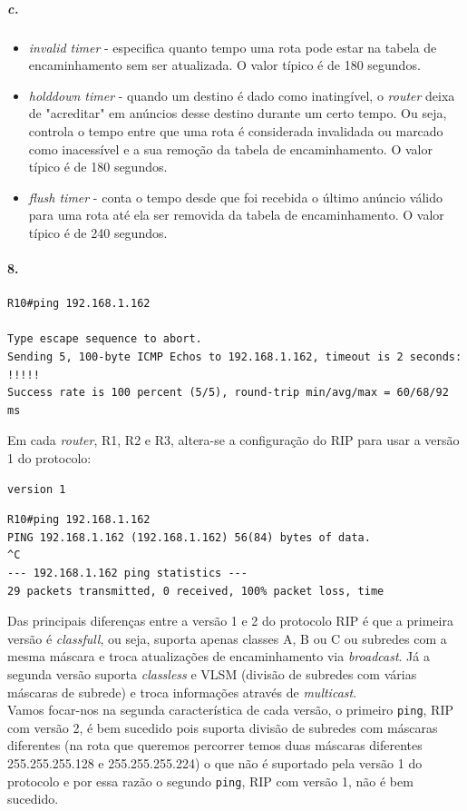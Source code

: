 \subparagraph{c.}
\begin{itemize}
\item \emph{invalid timer} - especifica quanto tempo uma rota pode estar na tabela de encaminhamento sem ser atualizada. O valor típico é de 180 segundos.
\item \emph{holddown timer} - quando um destino é dado como inatingível, o \emph{router} deixa de "acreditar" em anúncios desse destino durante um certo tempo. Ou seja,  controla o tempo entre que uma rota é considerada invalidada ou marcado como inacessível e a sua remoção da tabela de encaminhamento. O valor típico é de 180 segundos.
\item \emph{flush timer} - conta o tempo desde que foi recebida o último anúncio válido
para uma rota até ela ser removida da tabela de encaminhamento. O valor típico é de 240 segundos.
\end{itemize}

\paragraph{8.}
\begin{verbatim}
R10#ping 192.168.1.162

Type escape sequence to abort.
Sending 5, 100-byte ICMP Echos to 192.168.1.162, timeout is 2 seconds:
!!!!!
Success rate is 100 percent (5/5), round-trip min/avg/max = 60/68/92 ms
\end{verbatim}

Em cada \emph{router}, \textsf{R1}, \textsf{R2} e \textsf{R3}, altera-se a configuração do RIP para usar a versão 1 do protocolo:
\begin{verbatim}
version 1
\end{verbatim}

\begin{verbatim}
R10#ping 192.168.1.162
PING 192.168.1.162 (192.168.1.162) 56(84) bytes of data.
^C
--- 192.168.1.162 ping statistics ---
29 packets transmitted, 0 received, 100% packet loss, time 
\end{verbatim}

Das principais diferenças entre a versão 1 e 2 do protocolo RIP é que a primeira versão é \emph{classfull}, ou seja, suporta apenas classes A, B ou C ou subredes com a mesma máscara e troca atualizações de encaminhamento via \emph{broadcast}. Já a segunda versão suporta \emph{classless} e VLSM (divisão de subredes com várias máscaras de subrede) e troca informações através de \emph{multicast}.\\
Vamos focar-nos na segunda característica de cada versão, o primeiro \texttt{ping}, RIP com versão 2, é bem sucedido pois suporta divisão de subredes com máscaras diferentes (na rota que queremos percorrer temos duas máscaras diferentes 255.255.255.128 e 255.255.255.224) o que não é suportado pela versão 1 do protocolo e por essa razão o segundo \texttt{ping}, RIP com versão 1, não é bem sucedido.

